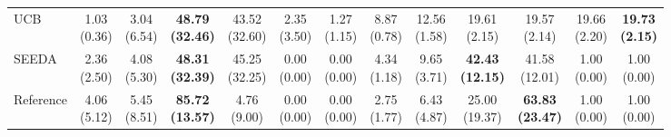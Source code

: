 {\begin{tabular}{l|cccccc|cccccc}
UCB & \makecell{1.03 \\ (0.36)} & \makecell{3.04 \\ (6.54)} & {\cellcolor[HTML]{C8E6C9}} \bfseries \makecell{48.79 \\ (32.46)} & \makecell{43.52 \\ (32.60)} & \makecell{2.35 \\ (3.50)} & \makecell{1.27 \\ (1.15)} & \makecell{8.87 \\ (0.78)} & \makecell{12.56 \\ (1.58)} & {\cellcolor[HTML]{C8E6C9}} \makecell{19.61 \\ (2.15)} & \makecell{19.57 \\ (2.14)} & \makecell{19.66 \\ (2.20)} & \bfseries \makecell{19.73 \\ (2.15)} \\
SEEDA & \makecell{2.36 \\ (2.50)} & \makecell{4.08 \\ (5.30)} & {\cellcolor[HTML]{C8E6C9}} \bfseries \makecell{48.31 \\ (32.39)} & \makecell{45.25 \\ (32.25)} & \makecell{0.00 \\ (0.00)} & \makecell{0.00 \\ (0.00)} & \makecell{4.34 \\ (1.18)} & \makecell{9.65 \\ (3.71)} & {\cellcolor[HTML]{C8E6C9}} \bfseries \makecell{42.43 \\ (12.15)} & \makecell{41.58 \\ (12.01)} & \makecell{1.00 \\ (0.00)} & \makecell{1.00 \\ (0.00)} \\
Reference & \makecell{4.06 \\ (5.12)} & \makecell{5.45 \\ (8.51)} & {\cellcolor[HTML]{C8E6C9}} \bfseries \makecell{85.72 \\ (13.57)} & \makecell{4.76 \\ (9.00)} & \makecell{0.00 \\ (0.00)} & \makecell{0.00 \\ (0.00)} & \makecell{2.75 \\ (1.77)} & \makecell{6.43 \\ (4.87)} & {\cellcolor[HTML]{C8E6C9}} \makecell{25.00 \\ (19.37)} & \bfseries \makecell{63.83 \\ (23.47)} & \makecell{1.00 \\ (0.00)} & \makecell{1.00 \\ (0.00)} \\

\end{tabular}}
